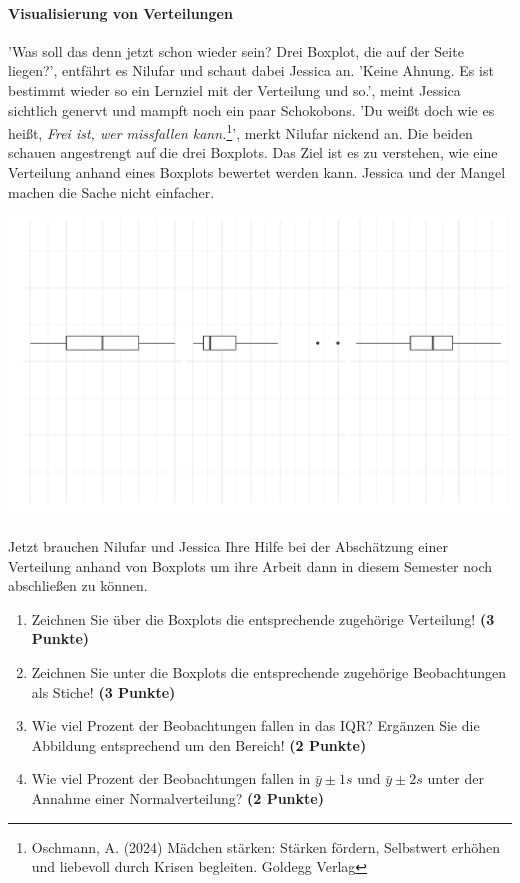 \documentclass[a4paper, 9pt]{scrartcl}\usepackage[]{graphicx}\usepackage[]{xcolor}
\makeatletter
\def\maxwidth{ %
  \ifdim\Gin@nat@width>\linewidth
    \linewidth
  \else
    \Gin@nat@width
  \fi
}
\makeatother
\begin{document}
\paragraph{Visualisierung von Verteilungen}

'Was soll das denn jetzt schon wieder sein? Drei Boxplot, die auf der Seite liegen?', entfährt es Nilufar und schaut dabei Jessica an. 'Keine Ahnung. Es ist bestimmt wieder so ein Lernziel mit der Verteilung und so.', meint Jessica sichtlich genervt und mampft noch ein paar Schokobons. 'Du weißt doch wie es heißt, \textit{Frei ist, wer missfallen kann.}\footnote{Oschmann, A. (2024) Mädchen stärken: Stärken fördern, Selbstwert erhöhen und liebevoll durch Krisen begleiten. Goldegg Verlag}', merkt Nilufar nickend an. Die beiden schauen angestrengt auf die drei Boxplots. Das Ziel ist es zu verstehen, wie eine Verteilung anhand eines Boxplots bewertet werden kann. Jessica und der Mangel machen die Sache nicht einfacher.



{\centering \includegraphics[width=\maxwidth]{img/desc-stat-11-1} 

}




Jetzt brauchen Nilufar und Jessica Ihre Hilfe bei der Abschätzung einer Verteilung anhand von Boxplots um ihre Arbeit dann in diesem Semester noch abschließen zu können.

\begin{enumerate}
\item Zeichnen Sie über die Boxplots die entsprechende zugehörige Verteilung! \textbf{(3 Punkte)} 
\item Zeichnen Sie unter die Boxplots die entsprechende zugehörige Beobachtungen als Stiche! \textbf{(3 Punkte)}
\item Wie viel Prozent der Beobachtungen fallen in das IQR? Ergänzen Sie die Abbildung entsprechend um den Bereich! \textbf{(2 Punkte)}
\item Wie viel Prozent der Beobachtungen fallen in $\bar{y} \pm 1s$ und $\bar{y} \pm 2s$  unter der Annahme einer Normalverteilung? \textbf{(2 Punkte)}
\end{enumerate} 
\clearpage
\end{document}
